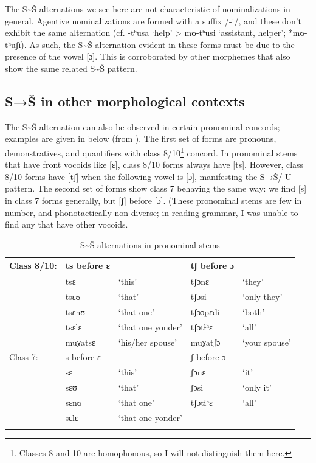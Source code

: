 \documentclass[output=paper,newtxmath,modfonts,nonflat]{langsci/langscibook}
\begin{document}
The S{\textasciitilde}Š alternations we see here are not characteristic of nominalizations in general. Agentive nominalizations are formed with a suffix /-i/, and these don’t exhibit the same alternation (cf. -tʰusa ‘help’ > mʊ-tʰusi ‘assistant, helper’; *mʊ-tʰuʃi). As such, the S{\textasciitilde}Š alternation evident in these forms must be due to the presence of the vowel [ɔ]. This is corroborated by other morphemes that also show the same related S{\textasciitilde}Š pattern.

\subsection{S→Š in other morphological contexts}\label{sec:bennett:2.4}

The S{\textasciitilde}Š alternation can also be observed in certain pronominal concords; examples are given in  below (from \citealt{Cole1955}). The first set of forms are pronouns, demonstratives, and quantifiers with class 8/10\footnote{Classes 8 and 10 are homophonous, so I will not distinguish them here.} concord. In pronominal stems that have front vocoids like [ɛ], class 8/10 forms always have [ts]. However, class 8/10 forms have [tʃ] when the following vowel is [ɔ], manifesting the S→Š/ {\longrule} U pattern. The second set of forms show class 7 behaving the same \break  way: we find [s] in class 7 forms generally, but [ʃ] before [ɔ]. (These pronominal stems are few in number, and phonotactically non-diverse; in reading  grammar, I was unable to find any that have other vocoids.

\vspace{.05in}
\begin{table}
\begin{tabularx}{\textwidth}{llQll}
\lsptoprule
Class 8/10: & ts before ɛ &  & tʃ before ɔ & \\
\midrule
& tsɛ & ‘this’ & tʃɔnɛ & ‘they’\\
& tsɛʊ & ‘that’ & tʃɔsi & ‘only they’\\
& tsɛnʊ & ‘that one’ & tʃɔɔpɛdi & ‘both’\\
& tsɛlɛ & ‘that one yonder’ & tʃɔtɬʰɛ & ‘all’\\
& muχatsɛ & ‘his/her spouse’ & muχatʃɔ & ‘your spouse’\\
\midrule
Class 7: & s before ɛ &  & ʃ before ɔ & \\
\midrule
& sɛ & ‘this’ & ʃɔnɛ & ‘it’\\
& sɛʊ & ‘that’ & ʃɔsi & ‘only it’\\
& sɛnʊ & ‘that one’ & tʃɔtɬʰɛ & ‘all’\\
& sɛlɛ & ‘that one yonder’ &  & \\
\lspbottomrule
\end{tabularx}
\caption{S{\textasciitilde}Š alternations in pronominal stems\label{tab:bennett:3}}
\end{table}
\end{document}
